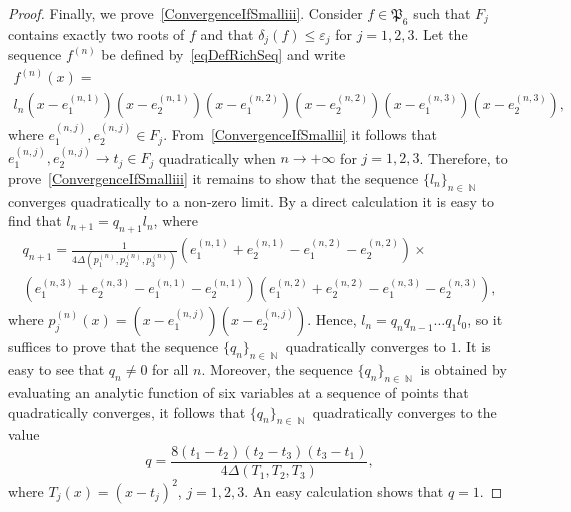 \documentclass{amsart}
\numberwithin{equation}{section}
\theoremstyle{definition}
\theoremstyle{remark}
\DeclareMathOperator{\NN}{\mathbb N}
\begin{document}
\begin{proof}
		Finally, we prove~\ref{ConvergenceIfSmalliii}. Consider $f \in \mathfrak P_6$ such that $F_j$ contains exactly two roots of $f$ and that $\delta_j(f) \le \varepsilon_j$ for $j = 1,2,3$. Let the sequence $f^{(n)}$ be defined by~\eqref{eqDefRichSeq} and write
		\begin{multline*}
			f^{(n)}(x) = \\ l_n\left(x - e_1^{(n,1)}\right)\left(x - e_2^{(n,1)}\right)\left(x - e_1^{(n,2)}\right)\left(x - e_2^{(n,2)}\right)\left(x - e_1^{(n,3)}\right)\left(x - e_2^{(n,3)}\right),
		\end{multline*}
		where $e_1^{(n,j)}, e_2^{(n,j)} \in F_j$. From~\ref{ConvergenceIfSmallii} it follows that $e_1^{(n,j)},e_2^{(n,j)} \to t_j \in F_j$ quadratically when $n \to +\infty$ for $j = 1,2,3$. Therefore, to prove~\ref{ConvergenceIfSmalliii} it remains to show that the sequence $\{l_n\}_{n \in \NN}$ converges quadratically to a non-zero limit. By a direct calculation it is easy to find that $l_{n+1} = q_{n+1}l_n$, where
		\begin{multline*}
			q_{n+1} = \frac{1}{4\Delta\left(p_1^{(n)}, p_2^{(n)}, p_3^{(n)}\right)}\left(e_1^{(n,1)} + e_2^{(n,1)} - e_1^{(n,2)} - e_2^{(n,2)}\right) \times \\ \left(e_1^{(n,3)} + e_2^{(n,3)} - e_1^{(n,1)} - e_2^{(n,1)}\right)\left(e_1^{(n,2)} + e_2^{(n,2)} - e_1^{(n,3)} - e_2^{(n,3)}\right),
		\end{multline*}
		where $p_j^{(n)}(x) = \left(x - e_1^{(n,j)}\right)\left(x - e_2^{(n,j)}\right)$. Hence, $l_{n} = q_nq_{n-1}\dots q_1l_0$, so it suffices to prove that the sequence $\{q_n\}_{n \in \NN}$ quadratically converges to $1$. It is easy to see that $q_n \ne 0$ for all $n$. Moreover, the sequence $\{q_n\}_{n \in \NN}$ is obtained by evaluating an analytic function of six variables at a sequence of points that quadratically converges, it follows that $\{q_n\}_{n \in \NN}$ quadratically converges to the value
		\[
		q = \frac{8(t_1 - t_2)(t_2 - t_3)(t_3 - t_1)}{4\Delta(T_1,T_2,T_3)},
		\]
		where $T_j(x) = (x - t_j)^2$, $j = 1,2,3$. An easy calculation shows that $q = 1$.
	\end{proof}
\end{document}
